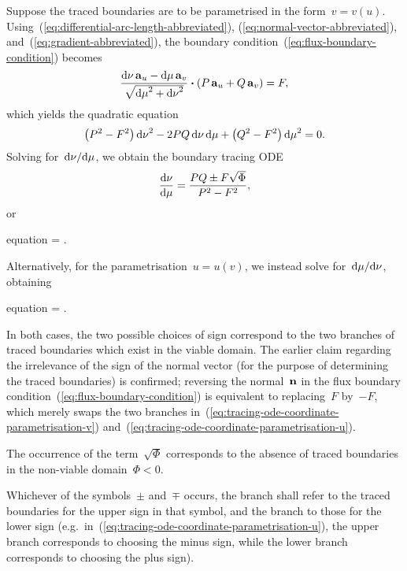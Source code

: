 Suppose the traced boundaries are to be parametrised
in the form~$v = v (u)$.
Using~(\ref{eq:differential-arc-length-abbreviated}),
(\ref{eq:normal-vector-abbreviated}),
and~(\ref{eq:gradient-abbreviated}),
the boundary condition~(\ref{eq:flux-boundary-condition}) becomes
\[
  \frac{
    \td \nu \basisvec{u} - \td \mu \basisvec{v}
  }{
    \sqrt{{\td \mu}^2 + {\td \nu}^2}
  }
    \dotp
  \roundbr[\bulkysize]{P \basisvec{u} + Q \basisvec{v}}
    =
  F,
\]
which yields the quadratic equation
\begin{equation}
  \roundbr*{P^2 - F^2} \, {\td \nu}^2
  - 2 P Q \td \nu \td \mu
  + \roundbr*{Q^2 - F^2} \, {\td \mu}^2
    =
  0.
  \label{eq:tracing-coordinate-parametrisation-quadratic}
\end{equation}
Solving for~$\mathop{}\!\mathrm{d} \nu / {\mathop{}\!\mathrm{d} \mu}$, we obtain the boundary tracing ODE
\begin{equation}
  \tder{\nu}{\mu} = \frac{P Q \pm F \sqrt{\Phi}}{P^2 - F^2},
  \label{eq:tracing-ode-coordinate-parametrisation-nu}
\end{equation}
or
\begin{important}{equation}
   =
    \frac{\scalefac[u]}{\scalefac[v]}
      \cdot
    .
  \label{eq:tracing-ode-coordinate-parametrisation-v}
\end{important}
Alternatively, for the parametrisation~$u = u (v)$,
we instead solve for~$\mathop{}\!\mathrm{d} \mu / {\mathop{}\!\mathrm{d} \nu}$, obtaining
\begin{important}{equation}
   =
    \frac{\scalefac[v]}{\scalefac[u]}
      \cdot
    .
  \label{eq:tracing-ode-coordinate-parametrisation-u}
\end{important}
In both cases, the two possible choices of sign
correspond to the two branches of traced boundaries
which exist in the viable domain.
The earlier claim regarding the irrelevance
of the sign of the normal vector
(for the purpose of determining the traced boundaries)
is confirmed;
reversing the normal~$\mathop{}\!\boldsymbol{\mathbf{n}}$
in the flux boundary condition~(\ref{eq:flux-boundary-condition})
is equivalent to replacing~$F$ by~$-F$,
which merely swaps the two branches
in~(\ref{eq:tracing-ode-coordinate-parametrisation-v})
and~(\ref{eq:tracing-ode-coordinate-parametrisation-u}).

The occurrence of the term~$\sqrt{\Phi}$
corresponds to the absence of traced boundaries
in the non-viable domain~$\Phi < 0$.

Whichever of the symbols~$\pm$ and~$\mp$ occurs,
the  branch shall refer to
the traced boundaries for the upper sign in that symbol,
and the  branch to those for the lower sign
(e.g.~in~(\ref{eq:tracing-ode-coordinate-parametrisation-u}),
the upper branch corresponds to choosing the minus sign,
while the lower branch corresponds to choosing the plus sign).

